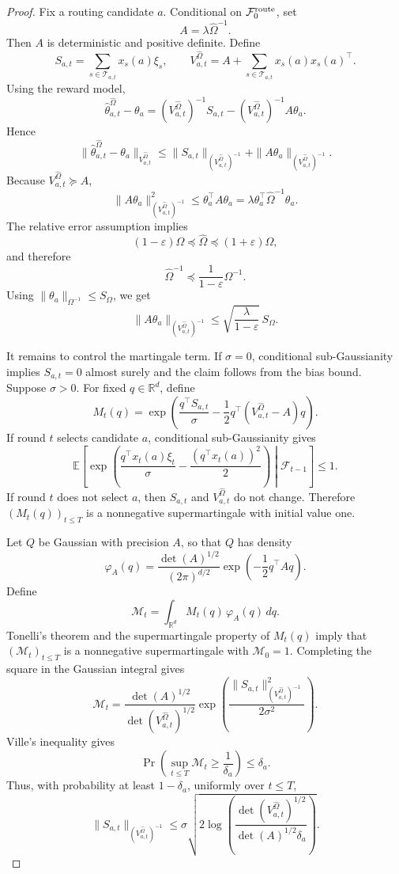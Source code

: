 \documentclass{article} %
\begin{document}
\begin{proof}
Fix a routing candidate \(a\). Conditional on
\(\mathcal F_0^{\rm route}\), set
\[
A=\lambda\widehat\Omega^{-1}.
\]
Then \(A\) is deterministic and positive definite.  Define
\[
S_{a,t}=\sum_{s\in\mathcal{T}_{a,t}}x_s(a)\xi_s,
\qquad
V_{a,t}^{\widehat\Omega}
=
A+\sum_{s\in\mathcal{T}_{a,t}}x_s(a)x_s(a)^\top.
\]
Using the reward model,
\[
\widehat\theta_{a,t}^{\widehat\Omega}-\theta_a
=
(V_{a,t}^{\widehat\Omega})^{-1}S_{a,t}
-
(V_{a,t}^{\widehat\Omega})^{-1}A\theta_a.
\]
Hence
\[
\|\widehat\theta_{a,t}^{\widehat\Omega}-\theta_a\|_{V_{a,t}^{\widehat\Omega}}
\le
\|S_{a,t}\|_{(V_{a,t}^{\widehat\Omega})^{-1}}
+
\|A\theta_a\|_{(V_{a,t}^{\widehat\Omega})^{-1}}.
\]
Because \(V_{a,t}^{\widehat\Omega}\succeq A\),
\[
\|A\theta_a\|_{(V_{a,t}^{\widehat\Omega})^{-1}}^2
\le
\theta_a^\top A\theta_a
=
\lambda\theta_a^\top\widehat\Omega^{-1}\theta_a.
\]
The relative error assumption implies
\[
(1-\varepsilon)\Omega\preceq\widehat\Omega\preceq(1+\varepsilon)\Omega,
\]
and therefore
\[
\widehat\Omega^{-1}\preceq\frac{1}{1-\varepsilon}\Omega^{-1}.
\]
Using \(\|\theta_a\|_{\Omega^{-1}}\le S_\Omega\), we get
\[
\|A\theta_a\|_{(V_{a,t}^{\widehat\Omega})^{-1}}
\le
\sqrt{\frac{\lambda}{1-\varepsilon}}\,S_\Omega.
\]

It remains to control the martingale term. If \(\sigma=0\), conditional
sub-Gaussianity implies \(S_{a,t}=0\) almost surely and the claim follows from
the bias bound. Suppose \(\sigma>0\). For fixed \(q\in\mathbb{R}^d\),
define
\[
M_t(q)
=
\exp\!\left(
\frac{q^\top S_{a,t}}{\sigma}
-
\frac{1}{2}
q^\top
\left(V_{a,t}^{\widehat\Omega}-A\right)
q
\right).
\]
If round \(t\) selects candidate \(a\), conditional sub-Gaussianity gives
\[
\mathbb E\!\left[
\exp\!\left(
\frac{q^\top x_t(a)\xi_t}{\sigma}
-\frac{(q^\top x_t(a))^2}{2}
\right)
\middle|\mathcal F_{t-1}
\right]
\le1.
\]
If round \(t\) does not select \(a\), then \(S_{a,t}\) and
\(V_{a,t}^{\widehat\Omega}\) do not change. Therefore
\((M_t(q))_{t\le T}\) is a nonnegative supermartingale with initial value one.

Let \(Q\) be Gaussian with precision \(A\), so that \(Q\) has density
\[
\varphi_A(q)
=
\frac{\det(A)^{1/2}}{(2\pi)^{d/2}}
\exp\!\left(-\frac{1}{2}q^\top A q\right).
\]
Define
\[
\mathcal{M}_t
=
\int_{\mathbb{R}^d} M_t(q)\,\varphi_A(q)\,dq.
\]
Tonelli's theorem and the supermartingale property of \(M_t(q)\) imply that
\((\mathcal{M}_t)_{t\le T}\) is a nonnegative supermartingale with
\(\mathcal{M}_0=1\).  Completing the square in the Gaussian integral gives
\[
\mathcal{M}_t
=
\frac{\det(A)^{1/2}}{\det(V_{a,t}^{\widehat\Omega})^{1/2}}
\exp\!\left(
\frac{\|S_{a,t}\|_{(V_{a,t}^{\widehat\Omega})^{-1}}^2}{2\sigma^2}
\right).
\]
Ville's inequality gives
\[
\Pr\!\left(\sup_{t\le T}\mathcal{M}_t\ge \frac1{\delta_a}\right)
\le
\delta_a.
\]
Thus, with probability at least \(1-\delta_a\), uniformly over \(t\le T\),
\[
\|S_{a,t}\|_{(V_{a,t}^{\widehat\Omega})^{-1}}
\le
\sigma
\sqrt{
2\log\!\left(
\frac{\det(V_{a,t}^{\widehat\Omega})^{1/2}}
{\det(A)^{1/2}\delta_a}
\right)
}.
\]


\end{proof}
\end{document}
